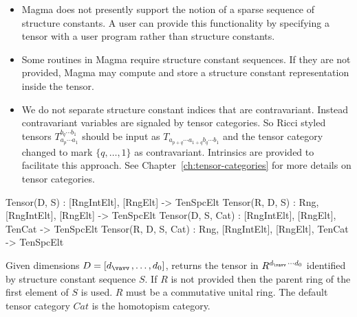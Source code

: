 \begin{itemize}
\item Magma does not presently support the notion of a sparse sequence of structure constants.
A user can provide this functionality by specifying a tensor with a user program rather
than structure constants. 

\item Some routines in Magma require structure constant sequences.  If they 
are not provided, Magma may compute and store a structure constant representation
inside the tensor.

\item We do not separate structure constant indices that are contravariant.  Instead contravariant variables are signaled by tensor categories.  So Ricci styled tensors $T_{a_p\cdots a_1}^{b_q\cdots b_1}$ should be input as $T_{a_{p+q}\cdots a_{1+q} b_q\cdots b_1}$ and the tensor
category changed to mark $\{q,\dots,1\}$ as contravariant. Intrinsics are provided to facilitate this approach.
See Chapter~\ref{ch:tensor-categories} for more details on tensor categories.
\end{itemize}
\medskip

\begin{intrinsics}
Tensor(D, S) : [RngIntElt], [RngElt] -> TenSpcElt
Tensor(R, D, S) : Rng, [RngIntElt], [RngElt] -> TenSpcElt
Tensor(D, S, Cat) : [RngIntElt], [RngElt], TenCat -> TenSpcElt
Tensor(R, D, S, Cat) : Rng, [RngIntElt], [RngElt], TenCat -> TenSpcElt
\end{intrinsics}

Given dimensions $D=[d_{\vav},\dots,d_0]$, returns the tensor
in $R^{d_{\vav}\cdots d_0}$ identified by structure constant sequence $S$.
If $R$ is not provided then the parent ring of the first element of $S$ is used.  
$R$ must be a commutative unital ring.
The default tensor category $Cat$ is the homotopism category.


